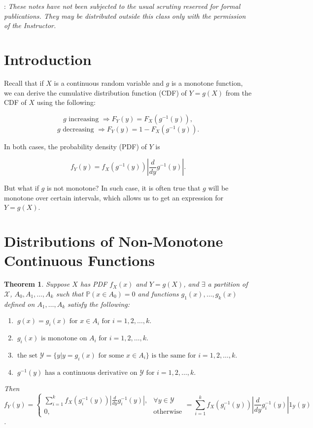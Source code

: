 \documentclass{article}
\theoremstyle{plain}
\newtheorem{thm}{Theorem}[section]
\theoremstyle{definition}
\begin{document}

: {\it These notes have not been subjected to
the usual scrutiny reserved for formal publications.  They may be
distributed outside this class only with the permission of the
Instructor.} %

\section{Introduction}

Recall that if $X$ is a continuous random variable and $g$ is a monotone function, we can derive the cumulative distribution function (CDF) of $Y = g(X)$ from the CDF of $X$ using the following:

$$g \text{ increasing } \Rightarrow F_Y(y) = F_X(g^{-1}(y)),$$
$$g \text{ decreasing } \Rightarrow F_Y(y) = 1-F_X(g^{-1}(y)).$$

In both cases, the probability density (PDF) of $Y$ is 

$$f_Y(y) = f_X(g^{-1}(y)) \left|\frac{d}{dy} g^{-1}(y) \right|.$$

But what if $g$ is not monotone? In such case, it is often true that $g$ will be monotone over certain intervals, which allows us to get an expression for $Y = g(X)$.

\section{Distributions of Non-Monotone Continuous Functions}

\begin{thm} \label{thm:1dchaofvar}
    Suppose $X$ has PDF $f_X(x)$ and $Y = g(X)$, and $\exists$ a partition of $\mathcal{X}$, $A_0, A_1, \dots, A_k$ such that $\mathbb{P}(x \in A_0) = 0$ and functions $g_1(x), \dots, g_k(x)$ defined on $A_1, \dots, A_k$ satisfy the following: 
    \begin{enumerate}[label=(\roman*)]
\item  $\ g(x) = g_i(x) \text{ for } x \in A_i \text{ for } i = 1, 2, \dots, k.$
\item     $ \ g_i(x) \text{ is monotone on } A_i \text{ for } i = 1, 2, \dots, k.$
 \item    $ \ \text{the set } \mathcal{Y} = \{y | y=g_i(x) \text{ for some } x \in A_i\} \text{ is the same for } i = 1, 2, \dots, k.$
 \item    $ \ g^{-1}(y) \text{ has a continuous derivative on } \mathcal{Y} \text{ for } i = 1, 2, \dots, k.$
\end{enumerate}
    Then $$f_Y(y) = \begin{cases}  \sum_{i=1}^k f_X(g_i^{-1}(y)) \left|\frac{d}{dy} g_i^{-1}(y) \right|, & \forall y \in \mathcal{Y} \\ 0, & \text{otherwise} \end{cases}  = \sum_{i=1}^k f_X(g_i^{-1}(y)) \left|\frac{d}{dy} g_i^{-1}(y) \right| 1_{\mathcal{Y}}(y)$$ .
\end{thm}
\end{document}

